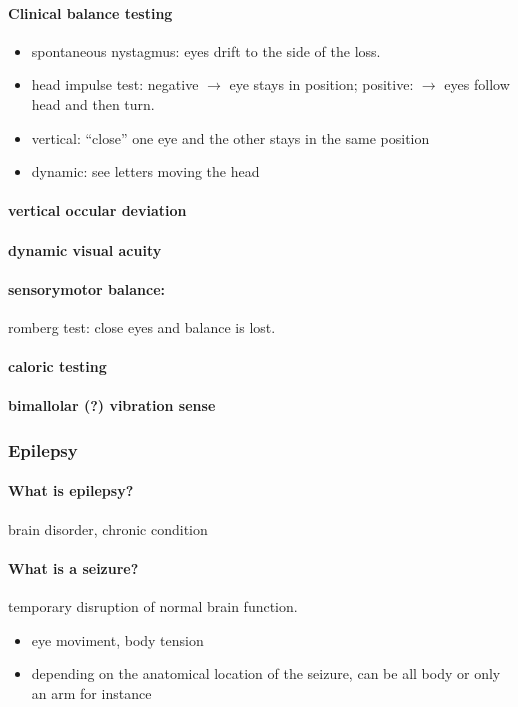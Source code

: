 \documentclass[12pt,article,oneside,a4paper]{memoir}
\begin{document}
\paragraph{Clinical balance testing}
\begin{itemize}
\item spontaneous nystagmus: eyes drift to the side of the loss.
\item head impulse test: negative $\rightarrow$ eye stays in position; positive: $\rightarrow$ eyes follow head and then turn.
\item vertical: ``close'' one eye and the other stays in the same position
\item dynamic: see letters moving the head
\end{itemize}

\paragraph{vertical occular deviation}
\paragraph{dynamic visual acuity}

\paragraph{sensorymotor balance:} romberg test: close eyes and balance is lost.
\paragraph{caloric testing}
\paragraph{bimallolar (?) vibration sense}

\subsubsection{Epilepsy}
\paragraph{What is epilepsy?} brain disorder, chronic condition
\paragraph{What is a seizure?} temporary disruption of normal brain function.
\begin{itemize}
\item eye moviment, body tension
\item depending on the anatomical location of the seizure, can be all body or only an arm for instance
\end{itemize}
\end{document}
